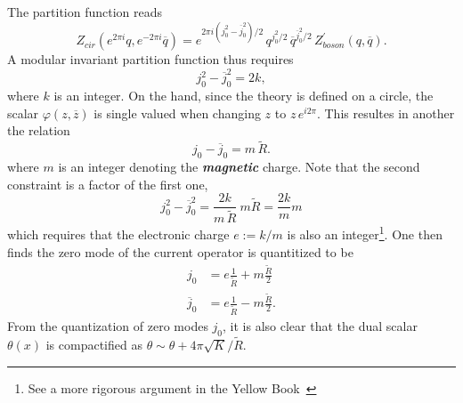 \documentclass[submission, PhysLectNotes]{SciPost}
\begin{document}
The partition function reads
\begin{equation}
	Z_{cir}(e^{2\pi i}q,e^{-2\pi i}\overline{q}) = e^{2\pi i \left(j_0^2 - \overline{j}_0^2\right)/2} \, q^{j_0^2/2} \, \overline{q}^{\overline{j}_0^2/2} \, Z^{\prime}_{boson} (q,\overline{q}).
\end{equation}
A modular invariant partition function thus requires 
\begin{equation}
	j_0^2 - \overline{j}_0^2 = 2k,
\end{equation}
where $k$ is an integer. On the hand, since the theory is defined on a circle, the scalar $\varphi(z,\overline{z})$ is single valued when changing $z$ to $z\,e^{i2\pi}$. This resultes in another the relation
\begin{equation}
	j_0 - \overline{j}_0 = m\,\tilde{R}.
\end{equation}
where $m$ is an integer denoting the \textbf{\textit{magnetic}} charge. Note that the second constraint is a factor of the first one, 
\begin{equation}
	j_0^2 - \overline{j}_0^2 = \frac{2k}{m\,\tilde{R}} \ m \tilde{R} = \frac{2k}{m} m
\end{equation}
which requires that the electronic charge $e := k/m$ is also an integer\footnote{See a more rigorous argument in the Yellow Book~\cite{francesco2012conformal}}. One then finds the zero mode of the current operator is quantitized to be 
\begin{equation}
	\begin{aligned}
		j_0 &= e \frac{1}{\tilde{R}} + m \frac{\tilde{R}}{2} \\
		\overline{j}_0 &= e \frac{1}{\tilde{R}} - m \frac{\tilde{R}}{2}.
	\end{aligned}
\end{equation}
From the quantization of zero modes $j_0$, it is also clear that the dual scalar $\theta(x)$ is compactified as $\theta \sim \theta + 4\pi\sqrt{K}/\tilde{R}$. 
\end{document}
